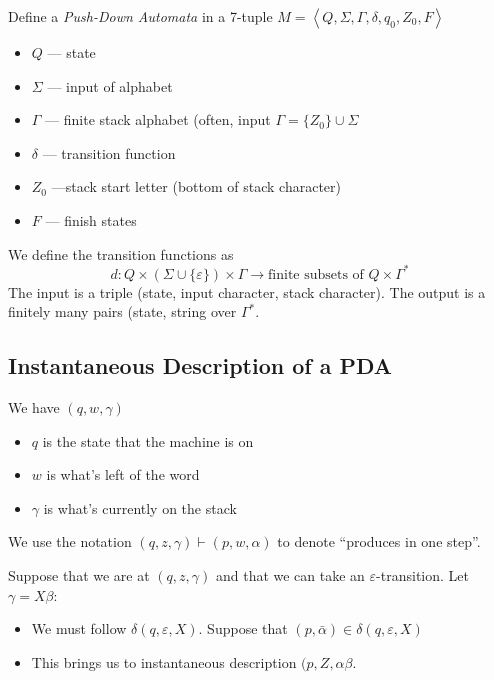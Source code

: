 \documentclass[12pt]{article}
\begin{document}
Define a \emph{Push-Down Automata} in a 7-tuple
$M=\left<Q,\Sigma,\Gamma,\delta,q_0,Z_0,F\right>$
\begin{itemize}
	\item $Q$ --- state
	\item $\Sigma$ --- input of alphabet
	\item $\Gamma$ --- finite stack alphabet (often, input $\Gamma = \{Z_0\}\cup
		\Sigma$
	\item $\delta$ --- transition function
	\item $Z_0$ ---stack start letter (bottom of stack character)
	\item $F$ --- finish states
\end{itemize}

We define the transition functions as
\[
d: Q \times (\Sigma \cup \{\varepsilon\}) \times \Gamma \to \text{finite subsets
of } Q \times \Gamma^*
\]
The input is a triple (state, input character, stack character). The output is a
finitely many pairs (state, string over $\Gamma^*$.

\subsection{Instantaneous Description of a PDA}

We have $(q,w,\gamma)$
\begin{itemize}
	\item $q$ is the state that the machine is on
	\item $w$ is what's left of the word
	\item $\gamma$ is what's currently on the stack
\end{itemize}

We use the notation $(q,z,\gamma) \vdash (p,w,\alpha)$ to denote ``produces
in one step''.

Suppose that we are at $(q,z,\gamma)$ and that we can take an
$\varepsilon$-transition. Let $\gamma = X\beta$:
\begin{itemize}
	\item We must follow $\delta(q,\varepsilon,X)$. Suppose that
		$(p,\bar{\alpha}) \in \delta(q,\varepsilon,X)$
	\item This brings us to instantaneous description $(p,Z,\alpha\beta$.
\end{itemize}
\end{document}

